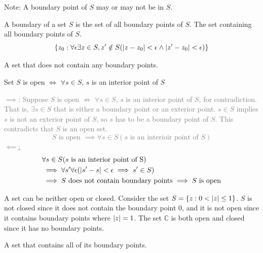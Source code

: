 \documentclass[12pt, english]{book}
\makeatletter
\renewenvironment{proof}[1][\proofname]{\par
	\pushQED{\qed}%
	\normalfont \topsep6\p@\@plus6\p@\relax
	\list{}{%
		\settowidth{\leftmargin}{\itshape\proofname:\hskip\labelsep}%
		\setlength{\labelwidth}{0pt}%
		\setlength{\itemindent}{-\leftmargin}%
		}%
	\item[\hskip\labelsep\itshape#1\@addpunct{:}]\ignorespaces
	}{\popQED\endlist\@endpefalse}
\makeatother
\begin{document}
	Note: A boundary point of $S$ may or may not be in $S$.

	\begin{definition}
		\label{Boundary of a Set Definition - Complex}
		A boundary of a set $S$ is the set of all boundary points of $S$. The set containing all boundary points of $S$.
		$$\{z_0 : \forall \epsilon \exists z\in S, z'\notin S(\abs{z-z_0}<\epsilon \land \abs{z'-z_0}<\epsilon )\}$$ 
	\end{definition}

	\begin{definition}
		\label{Open Set Definition - Complex}
		A set that does not contain any boundary points. 
	\end{definition}

	\begin{theorem}
		Set $S$ is open $\iff$ $\forall s \in S$, $s$ is an interior point of $S$ 
	\end{theorem}
	\begin{proof}
		\textcolor{Grey}{
		\underline{$\implies$}:
		Suppose $S$ is open $\nRightarrow$ $\forall s \in S$, $s$ is an interior point of $S$, for contradiction. That is, $\exists s \in S$ that is either a boundary point or an exterior point. $s \in S$ implies $s$ is not an exterior point of $S$, so $s$ has to be a boundary point of $S$. This contradicts that $S$ is an open set. 
		$$S \text{ is open } \implies \forall s \in S (s \text{ is an interioir point of }S)$$
		\underline{$\impliedby$:}
		\begin{align*}
			&\forall s \in S (s \text{ is an interior point of S}) \\
			&\implies \forall s' \forall \epsilon (\abs{s'-s} < \epsilon \implies s' \in S)\\
			&\implies S \text{ does not contain boundary points} \implies S \text{ is open}
		\end{align*}
		}
	\end{proof}

	A set can be neither open or closed. Consider the set $S = \{z : 0 < \abs{z} \leq 1\}$. $S$ is not closed since it does not contain the boundary point $0$, and it is not open since it contains boundary points where $\abs{z} = 1$. The set $\mathbb{C}$ is both open and closed since it has no boundary points. 
	
	\begin{definition}
		\label{Closed Set Definition - Complex}
		A set that contains all of its boundary points. 
	\end{definition}
\end{document}
